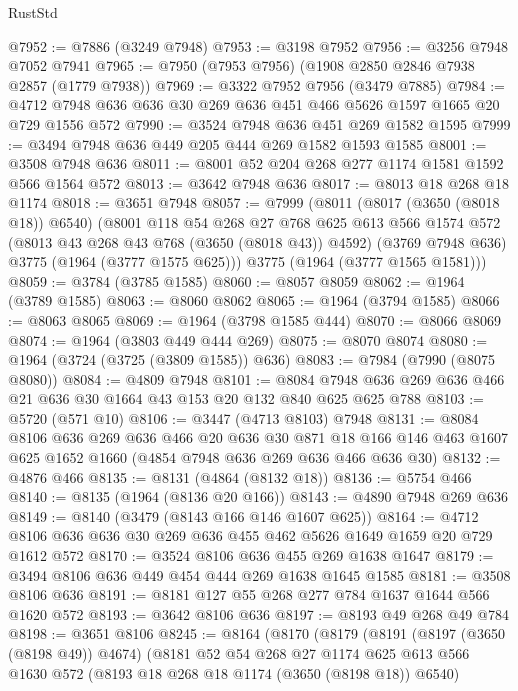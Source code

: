 \begin{lexlean}{RustStd}
\begin{coremodule}
@7952 := @7886 (@3249 @7948)
@7953 := @3198 @7952
@7956 := @3256 @7948 @7052 @7941
@7965 := @7950 (@7953 @7956) (@1908 @2850 @2846 @7938 @2857 (@1779 @7938))
@7969 := @3322 @7952 @7956 (@3479 @7885)
@7984 := @4712 @7948 @636 @636 @30 @269 @636 @451 @466 @5626 @1597 @1665 @20 @729 @1556 @572
@7990 := @3524 @7948 @636 @451 @269 @1582 @1595
@7999 := @3494 @7948 @636 @449 @205 @444 @269 @1582 @1593 @1585
@8001 := @3508 @7948 @636
@8011 := @8001 @52 @204 @268 @277 @1174 @1581 @1592 @566 @1564 @572
@8013 := @3642 @7948 @636
@8017 := @8013 @18 @268 @18 @1174
@8018 := @3651 @7948
@8057 := @7999
    (@8011
      (@8017 (@3650 (@8018 @18)) @6540)
      (@8001
        @118
        @54
        @268
        @27
        @768
        @625
        @613
        @566
        @1574
        @572
        (@8013 @43 @268 @43 @768 (@3650 (@8018 @43)) @4592)
        (@3769 @7948 @636)
        @3775
        (@1964 (@3777 @1575 @625)))
      @3775
      (@1964 (@3777 @1565 @1581)))
@8059 := @3784 (@3785 @1585)
@8060 := @8057 @8059
@8062 := @1964 (@3789 @1585)
@8063 := @8060 @8062
@8065 := @1964 (@3794 @1585)
@8066 := @8063 @8065
@8069 := @1964 (@3798 @1585 @444)
@8070 := @8066 @8069
@8074 := @1964 (@3803 @449 @444 @269)
@8075 := @8070 @8074
@8080 := @1964 (@3724 (@3725 (@3809 @1585)) @636)
@8083 := @7984 (@7990 (@8075 @8080))
@8084 := @4809 @7948
@8101 := @8084 @7948 @636 @269 @636 @466 @21 @636 @30 @1664 @43 @153 @20 @132 @840 @625 @625 @788
@8103 := @5720 (@571 @10)
@8106 := @3447 (@4713 @8103) @7948
@8131 := @8084
    @8106
    @636
    @269
    @636
    @466
    @20
    @636
    @30
    @871
    @18
    @166
    @146
    @463
    @1607
    @625
    @1652
    @1660
    (@4854 @7948 @636 @269 @636 @466 @636 @30)
@8132 := @4876 @466
@8135 := @8131 (@4864 (@8132 @18))
@8136 := @5754 @466
@8140 := @8135 (@1964 (@8136 @20 @166))
@8143 := @4890 @7948 @269 @636
@8149 := @8140 (@3479 (@8143 @166 @146 @1607 @625))
@8164 := @4712 @8106 @636 @636 @30 @269 @636 @455 @462 @5626 @1649 @1659 @20 @729 @1612 @572
@8170 := @3524 @8106 @636 @455 @269 @1638 @1647
@8179 := @3494 @8106 @636 @449 @454 @444 @269 @1638 @1645 @1585
@8181 := @3508 @8106 @636
@8191 := @8181 @127 @55 @268 @277 @784 @1637 @1644 @566 @1620 @572
@8193 := @3642 @8106 @636
@8197 := @8193 @49 @268 @49 @784
@8198 := @3651 @8106
@8245 := @8164
    (@8170
      (@8179
        (@8191
          (@8197 (@3650 (@8198 @49)) @4674)
          (@8181
            @52
            @54
            @268
            @27
            @1174
            @625
            @613
            @566
            @1630
            @572
            (@8193 @18 @268 @18 @1174 (@3650 (@8198 @18)) @6540)

\end{coremodule}
\end{lexlean}
